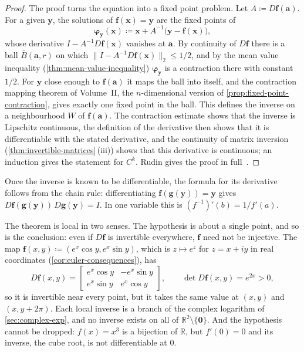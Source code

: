 \begin{proof}
The proof turns the equation into a fixed point problem. Let $A\coloneqq D\mathbf f(\mathbf a)$. For a given $\mathbf y$, the solutions of $\mathbf f(\mathbf x)=\mathbf y$ are the fixed points of
\[
\boldsymbol\varphi_{\mathbf y}(\mathbf x)\coloneqq\mathbf x+A^{-1}\bigl(\mathbf y-\mathbf f(\mathbf x)\bigr),
\]
whose derivative $I-A^{-1}D\mathbf f(\mathbf x)$ vanishes at $\mathbf a$. By continuity of $D\mathbf f$ there is a ball $\bar B(\mathbf a,r)$ on which $\|I-A^{-1}D\mathbf f(\mathbf x)\|_2\le1/2$, and by the mean value inequality (\cref{thm:mean-value-inequality}) $\boldsymbol\varphi_{\mathbf y}$ is a contraction there with constant $1/2$. For $\mathbf y$ close enough to $\mathbf f(\mathbf a)$ it maps the ball into itself, and the contraction mapping theorem of Volume~II, the $n$-dimensional version of \cref{prop:fixed-point-contraction}, gives exactly one fixed point in the ball. This defines the inverse on a neighbourhood $W$ of $\mathbf f(\mathbf a)$. The contraction estimate shows that the inverse is Lipschitz continuous, the definition of the derivative then shows that it is differentiable with the stated derivative, and the continuity of matrix inversion (\cref{thm:invertible-matrices}\,(iii)) shows that this derivative is continuous; an induction gives the statement for $C^k$. Rudin gives the proof in full~\cite[Thm.~9.24]{rudin1976}.
\end{proof}

Once the inverse is known to be differentiable, the formula for its derivative follows from the chain rule: differentiating $\mathbf f(\mathbf g(\mathbf y))=\mathbf y$ gives $D\mathbf f(\mathbf g(\mathbf y))\,D\mathbf g(\mathbf y)=I$. In one variable this is $(f^{-1})'(b)=1/f'(a)$.

The theorem is local in two senses. The hypothesis is about a single point, and so is the conclusion: even if $D\mathbf f$ is invertible everywhere, $\mathbf f$ need not be injective. The map $\mathbf f(x,y)\coloneqq(e^x\cos y,e^x\sin y)$, which is $z\mapsto e^z$ for $z=x+iy$ in real coordinates (\cref{cor:euler-consequences}), has
\[
D\mathbf f(x,y)=\begin{bmatrix}e^x\cos y&-e^x\sin y\\e^x\sin y&e^x\cos y\end{bmatrix},\qquad\det D\mathbf f(x,y)=e^{2x}>0 ,
\]
so it is invertible near every point, but it takes the same value at $(x,y)$ and $(x,y+2\pi)$. Each local inverse is a branch of the complex logarithm of \cref{sec:complex-exp}, and no inverse exists on all of $\mathbb R^2\setminus\{\mathbf0\}$. And the hypothesis cannot be dropped: $f(x)=x^3$ is a bijection of $\mathbb R$, but $f'(0)=0$ and its inverse, the cube root, is not differentiable at $0$.

